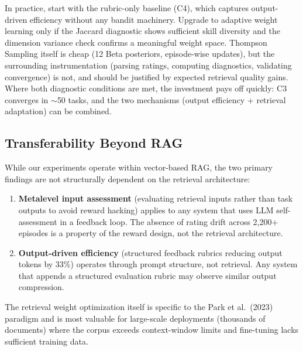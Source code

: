 In practice, start with the rubric-only baseline (C4), which captures output-driven efficiency without any bandit machinery.
Upgrade to adaptive weight learning only if the Jaccard diagnostic shows sufficient skill diversity and the dimension variance check confirms a meaningful weight space.
Thompson Sampling itself is cheap (12 Beta posteriors, episode-wise updates), but the surrounding instrumentation (parsing ratings, computing diagnostics, validating convergence) is not, and should be justified by expected retrieval quality gains.
Where both diagnostic conditions are met, the investment pays off quickly: C3 converges in ${\sim}$50 tasks, and the two mechanisms (output efficiency + retrieval adaptation) can be combined.

\subsection{Transferability Beyond RAG}

While our experiments operate within vector-based RAG, the two primary findings are not structurally dependent on the retrieval architecture:

\begin{enumerate}
\item \textbf{Metalevel input assessment} (evaluating retrieval inputs rather than task outputs to avoid reward hacking) applies to any system that uses LLM self-assessment in a feedback loop.
The absence of rating drift across 2{,}200+ episodes is a property of the reward design, not the retrieval architecture.

\item \textbf{Output-driven efficiency} (structured feedback rubrics reducing output tokens by 33\%) operates through prompt structure, not retrieval.
Any system that appends a structured evaluation rubric may observe similar output compression.
\end{enumerate}

The retrieval weight optimization itself is specific to the Park et al.\ (2023) paradigm and is most valuable for large-scale deployments (thousands of documents) where the corpus exceeds context-window limits and fine-tuning lacks sufficient training data.
